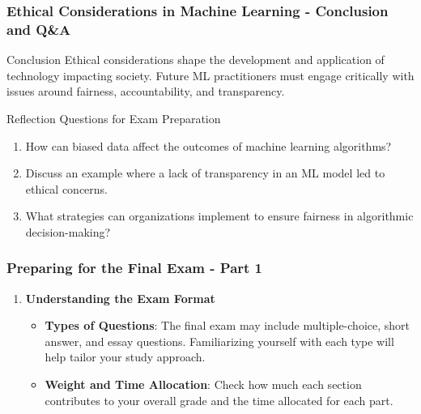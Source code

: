 \documentclass[aspectratio=169]{beamer}
\begin{document}
\begin{frame}[fragile]
    \frametitle{Ethical Considerations in Machine Learning - Conclusion and Q&A}
    \begin{block}{Conclusion}
        Ethical considerations shape the development and application of technology impacting society. Future ML practitioners must engage critically with issues around fairness, accountability, and transparency.
    \end{block}

    \begin{block}{Reflection Questions for Exam Preparation}
        \begin{enumerate}
            \item How can biased data affect the outcomes of machine learning algorithms?
            \item Discuss an example where a lack of transparency in an ML model led to ethical concerns.
            \item What strategies can organizations implement to ensure fairness in algorithmic decision-making?
        \end{enumerate}
    \end{block}
\end{frame}

\begin{frame}[fragile]
    \frametitle{Preparing for the Final Exam - Part 1}
    \begin{enumerate}
        \item \textbf{Understanding the Exam Format}
        \begin{itemize}
            \item \textbf{Types of Questions}: The final exam may include multiple-choice, short answer, and essay questions. Familiarizing yourself with each type will help tailor your study approach.
            \item \textbf{Weight and Time Allocation}: Check how much each section contributes to your overall grade and the time allocated for each part.
        \end{itemize}
    \end{enumerate}
\end{frame}
\end{document}
